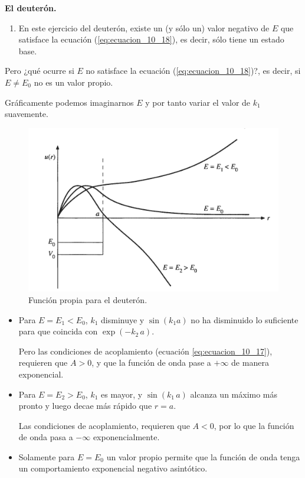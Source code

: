 \begin{ejemplo}{\textbf{El deuterón.}}
\begin{enumerate}
\item En este ejercicio del deuterón, existe un (y sólo un) valor negativo de $E$ que satisface la ecuación (\ref{eq:ecuacion_10_18}), es decir, sólo tiene un estado base.
\end{enumerate}
Pero ¿qué ocurre si $E$ no satisface la ecuación (\ref{eq:ecuacion_10_18})?, es decir, si $E \neq E_{0}$ no es un valor propio.
\par
Gráficamente podemos imaginarnos $E$ y por tanto variar el valor de $k_{1}$ suavemente.
\begin{figure}[!h]
    \centering
    \includegraphics[scale=1.3]{Imagenes/Tema3_01.png}
\caption{Función propia para el deuterón.}
\end{figure}
\begin{itemize}
\item Para $E = E_{1} < E_{0}$, $k_{1}$ disminuye y $\sin (k_{1} a)$ no ha disminuido lo suficiente para que coincida con $\exp(-k_{2} \, a)$. 
\par
Pero las condiciones de acoplamiento (ecuación \ref{eq:ecuacion_10_17}), requieren que $A > 0$, y que la función de onda pase a $+\infty$ de manera exponencial.
\item Para $E = E_{2} > E_{0}$, $k_{1}$ es mayor, y $\sin (k_{1} \, a)$ alcanza un máximo más pronto y luego decae más rápido que $r = a$.
\par
Las condiciones de acoplamiento, requieren que $A < 0$, por lo que la función de onda pasa a $-\infty$ exponencialmente.
\item Solamente para $E = E_{0}$ un valor propio permite que la función de onda tenga un comportamiento exponencial negativo asintótico.
\end{itemize}
\end{ejemplo}
